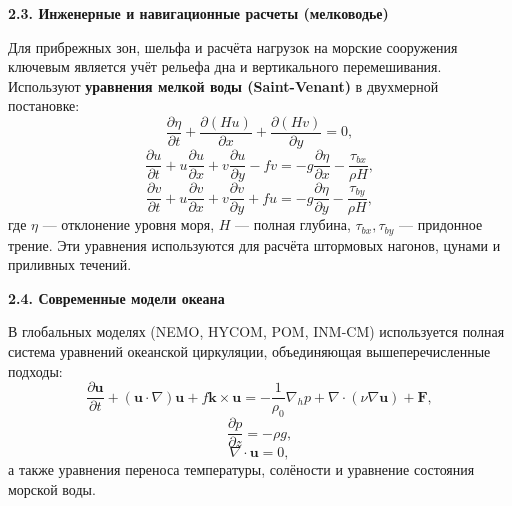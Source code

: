 \documentclass[a4paper,14pt]{extarticle}
\begin{document}
\vspace{\baselineskip}

\noindent \textbf{2.3. Инженерные и навигационные расчеты (мелководье)}

\noindent Для прибрежных зон, шельфа и расчёта нагрузок на морские сооружения ключевым является учёт рельефа дна и вертикального перемешивания. Используют \textbf{уравнения мелкой воды (Saint-Venant)} в двухмерной постановке:
\begin{equation}
    \frac{\partial \eta}{\partial t} + \frac{\partial (Hu)}{\partial x} + \frac{\partial (Hv)}{\partial y} = 0,
\end{equation}
\begin{equation}
    \frac{\partial u}{\partial t} + u \frac{\partial u}{\partial x} + v \frac{\partial u}{\partial y} - fv = 
    -g \frac{\partial \eta}{\partial x} - \frac{\tau_{bx}}{\rho H},
\end{equation}
\begin{equation}
    \frac{\partial v}{\partial t} + u \frac{\partial v}{\partial x} + v \frac{\partial v}{\partial y} + fu = 
    -g \frac{\partial \eta}{\partial y} - \frac{\tau_{by}}{\rho H},
\end{equation}
где $\eta$ — отклонение уровня моря, $H$ — полная глубина, $\tau_{bx}, \tau_{by}$ — придонное трение. Эти уравнения используются для расчёта штормовых нагонов, цунами и приливных течений.

\vspace{\baselineskip}

\noindent \textbf{2.4. Современные модели океана}

\noindent В глобальных моделях (NEMO, HYCOM, POM, INM-CM) используется полная система уравнений океанской циркуляции, объединяющая вышеперечисленные подходы:
\begin{equation}
    \frac{\partial \mathbf{u}}{\partial t} + (\mathbf{u} \cdot \nabla) \mathbf{u} + f \mathbf{k} \times \mathbf{u} = 
    -\frac{1}{\rho_0} \nabla_h p + \nabla \cdot (\nu \nabla \mathbf{u}) + \mathbf{F},
\end{equation}
\begin{equation}
    \frac{\partial p}{\partial z} = -\rho g,
\end{equation}
\begin{equation}
    \nabla \cdot \mathbf{u} = 0,
\end{equation}
а также уравнения переноса температуры, солёности и уравнение состояния морской воды.

\newpage
\end{document}
